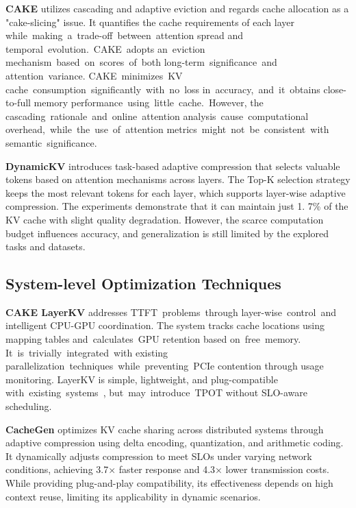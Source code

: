 \documentclass[sigconf,nonacm]{acmart}
\begin{document}
\textbf{CAKE} \cite{qin2025cakecascadingadaptivekv} utilizes cascading and adaptive eviction and regards cache allocation as a "cake-slicing" issue. It quantifies the cache requirements of each layer while making a trade-off between attention spread and temporal evolution. CAKE adopts an eviction mechanism based on scores of both long-term significance and attention variance. CAKE minimizes KV cache consumption significantly with no loss in accuracy, and it obtains close-to-full memory performance using little cache. However, the cascading rationale and online attention analysis cause computational overhead, while the use of attention metrics might not be consistent with semantic significance.

\textbf{DynamicKV} \cite{zhou2025dynamickvtaskawareadaptivekv} introduces task-based adaptive compression that selects valuable tokens based on attention mechanisms across layers. The Top-K selection strategy keeps the most relevant tokens for each layer,
which supports layer-wise adaptive compression. The experiments demonstrate that it can maintain just 1. 7\% of the KV cache with slight quality degradation. However, the scarce computation budget influences accuracy, and generalization is still limited by the explored tasks and datasets.
\subsection{System-level Optimization Techniques
}
\label{sec:subsection}
\textbf{CAKE LayerKV} \cite{xiong2024layerkvoptimizinglargelanguage} addresses TTFT problems through layer-wise control and intelligent CPU-GPU coordination. The system tracks cache locations using mapping tables and calculates GPU retention based on free memory. It is trivially integrated with existing parallelization techniques while preventing PCIe contention through usage monitoring. LayerKV is simple, lightweight, and plug-compatible with existing systems , but may introduce TPOT without SLO-aware scheduling.

\textbf{CacheGen} \cite{cachegencitation} optimizes KV cache sharing across distributed systems through adaptive compression using delta encoding, quantization, and arithmetic coding. It dynamically adjusts compression to meet SLOs under varying network conditions, achieving 3.7× faster response and 4.3× lower transmission costs. While providing plug-and-play compatibility, its effectiveness depends on high context reuse, limiting its applicability in dynamic scenarios.
\end{document}
